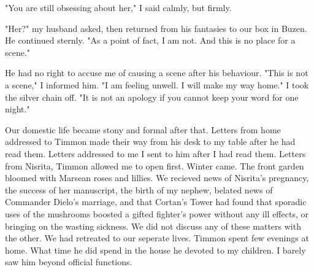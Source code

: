 \documentclass{article}
\begin{document}
"You are still obsessing about her," I said calmly, but firmly.

"Her?" my husband asked, then returned from his fantasies to our box in Buzen. He continued sternly. "As a point of fact, I am not. And this is no place for a scene."

He had no right to accuse me of causing a scene after his behaviour. "This is not a scene," I informed him. "I am feeling unwell. I will make my way home." I took the silver chain off. "It is not an apology if you cannot keep your word for one night."

\vspace{.5cm} 

Our domestic life became stony and formal after that. Letters from home addressed to Timmon made their way from his desk to my table after he had read them. Letters addressed to me I sent to him after I had read them. Letters from Nisrita, Timmon allowed me to open first. Winter came. The front garden bloomed with Marsean roses and lillies. We recieved news of Nisrita's pregnancy, the success of her manuscript, the birth of my nephew, belated news of Commander Dielo's marriage, and that Cortan's Tower had found that sporadic uses of the mushrooms boosted a gifted fighter's power without any ill effects, or bringing on the wasting sickness. We did not discuss any of these matters with the other. We had retreated to our seperate lives. Timmon spent few evenings at home. What time he did spend in the house he devoted to my children. I barely saw him beyond official functions.
\end{document}
